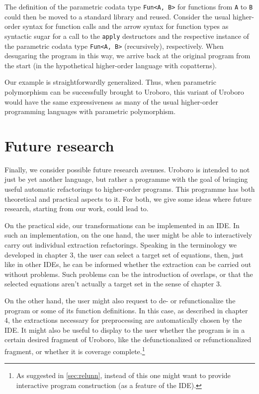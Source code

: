 The definition of the parametric codata type \texttt{Fun<A, B>} for functions from \texttt{A} to \texttt{B} could then be moved to a standard library and reused. Consider the usual higher-order syntax for function calls and the arrow syntax for function types as syntactic sugar for a call to the \texttt{apply} destructors and the respective instance of the parametric codata type \texttt{Fun<A, B>} (recursively), respectively. When desugaring the program in this way, we arrive back at the original program from the start (in the hypothetical higher-order language with copatterns).

Our example is straightforwardly generalized. Thus, when parametric polymorphism can be successfully brought to Uroboro, this variant of Uroboro would have the same expressiveness as many of the usual higher-order programming languages with parametric polymorphism.

\section{Future research}
\label{sec:futr}

Finally, we consider possible future research avenues. Uroboro is intended to not just be yet another language, but rather a programme with the goal of bringing useful automatic refactorings to higher-order programs. This programme has both theoretical and practical aspects to it. For both, we give some ideas where future research, starting from our work, could lead to.

On the practical side, our transformations can be implemented in an IDE. In such an implementation, on the one hand, the user might be able to interactively carry out individual extraction refactorings. Speaking in the terminology we developed in chapter 3, the user can select a target set of equations, then, just like in other IDEs, he can be informed whether the extraction can be carried out without problems. Such problems can be the introduction of overlaps, or that the selected equations aren't actually a target set in the sense of chapter 3.

On the other hand, the user might also request to de- or refunctionalize the program or some of its function definitions. In this case, as described in chapter 4, the extractions necessary for preprocessing are automatically chosen by the IDE. It might also be useful to display to the user whether the program is in a certain desired fragment of Uroboro, like the defunctionalized or refunctionalized fragment, or whether it is coverage complete.\footnote{As suggested in \autoref{sec:relunn}, instead of this one might want to provide interactive program construction (as a feature of the IDE).}

